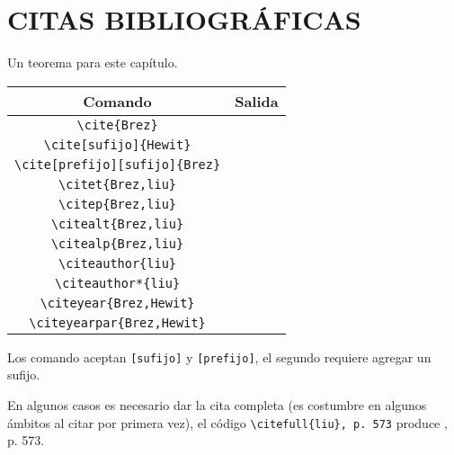 \chapter{CITAS BIBLIOGRÁFICAS}

\begin{thm}
	Un teorema para este capítulo.
\end{thm}

\begin{center}
	\begin{tabular}{c|c}
		\hline
		Comando	& Salida  \\
		\hline
		\verb|\cite{Brez}| & \cite{Brez} \\
		\hline
		\verb|\cite[sufijo]{Hewit}| & \cite[sufijo]{Hewit} \\
		\hline
		\verb|\cite[prefijo][sufijo]{Brez}| & \cite[prefijo][sufijo]{Brez} \\
		\hline
		\verb|\citet{Brez,liu}| & \citet{Brez,liu} \\
		\hline
		\verb|\citep{Brez,liu}| & \citep{Brez,liu} \\
		\hline
		\verb|\citealt{Brez,liu}| & \citealt{Brez,liu} \\
		\hline
		\verb|\citealp{Brez,liu}| & \citealp{Brez,liu} \\
		\hline
		\verb|\citeauthor{liu}| & \citeauthor{liu} \\
		\hline
		\verb|\citeauthor*{liu}| & \citeauthor*{liu} \\
		\hline
		\verb|\citeyear{Brez,Hewit}| & \citeyear{Brez,Hewit} \\
		\hline
		\verb|\citeyearpar{Brez,Hewit}| & \citeyearpar{Brez,Hewit} \\
		\hline
	\end{tabular}
\end{center} Los comando aceptan \verb|[sufijo]| y \verb|[prefijo]|, el segundo requiere agregar un sufijo.

En algunos casos es necesario dar la cita completa (es costumbre en algunos ámbitos al citar por primera vez), el código \verb|\citefull{liu}, p. 573| produce , p. 573.